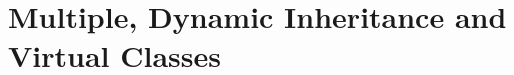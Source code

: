 \begin{comment}
\paragraph{Compilation of feature-oriented programming.}
\emph{Feature-oriented programming}
(FOP)~\citep{prehofer1997feature,apel2009overview} is a programming paradigm
that aims to modularize features in software product
lines~\citep{apel2013feature}. There is a debate on what modularity exactly
means, and \citet{kastner2011road} mention two notions of modularity:
\emph{cohesion} and \emph{information hiding}. The majority of FOP
work~\citep{batory2004scaling,apel2005featurec++,apel2013language} focuses on
the notion of cohesion and basically does source-to-source transformations,
which hinders modular type checking and separate compilation. There is some
other work, such as Jiazzi~\citep{mcdirmid2001jiazzi} and
Scala~\citep{odersky2005scalable}, leveraging information hiding instead and
supporting modular type checking and separate compilation. However, FOP is
usually achieved via verbose design patterns or metaprogramming in those
languages. For instance, some precursor work of compositional programming, done
in Scala, employs design patterns based on object
algebras~\citep{oliveira2012extensibility} to achieve
FOP~\citep{oliveira2013feature,rendel2014object}. Since merging is not directly
supported in Scala, specialized composition operators are required to simulate
merges for different object algebra interfaces. The creation and use of those
composition operators cause a significant burden for developing programs. In
contrast, CP natively supports merges, eliminating the need for such specialized
composition operators and supporting FOP more directly.

\emph{Delta-oriented programming}
(DOP)~\citep{schaefer2010delta} is an extension of FOP, which features delta
modules that can add, remove, or modify classes. A feature module is a delta
module without the remove operation. DOP supports compositional type
checking~\citep{bettini2013compositional} at the level of source code. More
recently, a core calculus for \emph{dynamic} DOP is proposed by
\citet{damiani2018core} to support runtime
variability~\citep{hallsteinsen2008dynamic} and is proven to be type-safe.
However, dynamic DOP is not yet implemented, and its separation compilation is
unexplored.
\end{comment}

\section{Multiple, Dynamic Inheritance and Virtual Classes}

